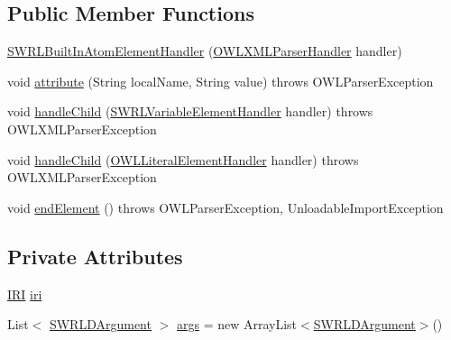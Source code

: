 \subsection*{Public Member Functions}
\begin{DoxyCompactItemize}
\item 
\hyperlink{classorg_1_1coode_1_1owlapi_1_1owlxmlparser_1_1_s_w_r_l_built_in_atom_element_handler_aee8de1a01a1568a6aff3e9708fac6261}{S\-W\-R\-L\-Built\-In\-Atom\-Element\-Handler} (\hyperlink{classorg_1_1coode_1_1owlapi_1_1owlxmlparser_1_1_o_w_l_x_m_l_parser_handler}{O\-W\-L\-X\-M\-L\-Parser\-Handler} handler)
\item 
void \hyperlink{classorg_1_1coode_1_1owlapi_1_1owlxmlparser_1_1_s_w_r_l_built_in_atom_element_handler_a3c38e9ba14f705e5877635db81364c29}{attribute} (String local\-Name, String value)  throws O\-W\-L\-Parser\-Exception 
\item 
void \hyperlink{classorg_1_1coode_1_1owlapi_1_1owlxmlparser_1_1_s_w_r_l_built_in_atom_element_handler_a03d1a0de036a415660cad435faf84f0d}{handle\-Child} (\hyperlink{classorg_1_1coode_1_1owlapi_1_1owlxmlparser_1_1_s_w_r_l_variable_element_handler}{S\-W\-R\-L\-Variable\-Element\-Handler} handler)  throws O\-W\-L\-X\-M\-L\-Parser\-Exception 
\item 
void \hyperlink{classorg_1_1coode_1_1owlapi_1_1owlxmlparser_1_1_s_w_r_l_built_in_atom_element_handler_acdbb1167cb3f84def7b65a75565f6288}{handle\-Child} (\hyperlink{classorg_1_1coode_1_1owlapi_1_1owlxmlparser_1_1_o_w_l_literal_element_handler}{O\-W\-L\-Literal\-Element\-Handler} handler)  throws O\-W\-L\-X\-M\-L\-Parser\-Exception 
\item 
void \hyperlink{classorg_1_1coode_1_1owlapi_1_1owlxmlparser_1_1_s_w_r_l_built_in_atom_element_handler_a3df02c8a23f9d7c3306e92bdd6c3c574}{end\-Element} ()  throws O\-W\-L\-Parser\-Exception, Unloadable\-Import\-Exception 
\end{DoxyCompactItemize}
\subsection*{Private Attributes}
\begin{DoxyCompactItemize}
\item 
\hyperlink{classorg_1_1semanticweb_1_1owlapi_1_1model_1_1_i_r_i}{I\-R\-I} \hyperlink{classorg_1_1coode_1_1owlapi_1_1owlxmlparser_1_1_s_w_r_l_built_in_atom_element_handler_a6b824f220057039e141f070bd6705e22}{iri}
\item 
List$<$ \hyperlink{interfaceorg_1_1semanticweb_1_1owlapi_1_1model_1_1_s_w_r_l_d_argument}{S\-W\-R\-L\-D\-Argument} $>$ \hyperlink{classorg_1_1coode_1_1owlapi_1_1owlxmlparser_1_1_s_w_r_l_built_in_atom_element_handler_ac74494af9ceb2e319fe9324276b621ed}{args} = new Array\-List$<$\hyperlink{interfaceorg_1_1semanticweb_1_1owlapi_1_1model_1_1_s_w_r_l_d_argument}{S\-W\-R\-L\-D\-Argument}$>$()
\end{DoxyCompactItemize}


